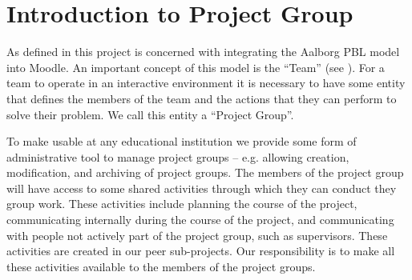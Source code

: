 \chapter{Introduction to Project Group}
\label{chap:introProjectgroup}

As defined in  this project is concerned with integrating the Aalborg PBL model into Moodle.
An important concept of this model is the ``Team'' (see ).
For a team to operate in an interactive environment it is necessary to have some entity that defines the members of the team and the actions that they can perform to solve their problem.
We call this entity a ``Project Group''.

To make \system{} usable at any educational institution we provide some form of administrative tool to manage project groups -- e.g. allowing  creation, modification, and archiving of project groups.
The members of the project group will have access to some shared activities through which they can conduct they group work.
These activities include planning the course of the project, communicating internally during the course of the project, and communicating with people not actively part of the project group, such as supervisors.
These activities are created in our peer sub-projects.
Our responsibility is to make all these activities available to the members of the project groups.


	